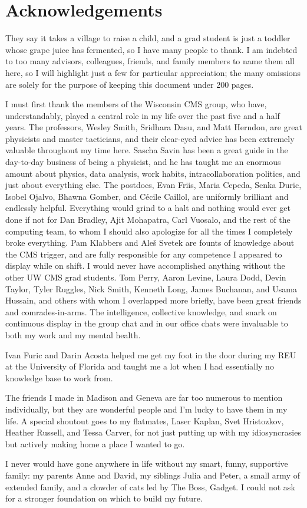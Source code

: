 
\section{Acknowledgements}

They say it takes a village to raise a child, and a grad student is just a toddler whose grape juice has fermented, so I have many people to thank.
I am indebted to too many advisors, colleagues, friends, and family members to name them all here, so I will highlight just a few for particular appreciation; the many omissions are solely for the purpose of keeping this document under 200 pages.

I must first thank the members of the Wisconsin CMS group, who have, understandably, played a central role in my life over the past five and a half years.
The professors, Wesley Smith, Sridhara Dasu, and Matt Herndon, are great physicists and master tacticians, and their clear-eyed advice has been extremely valuable throughout my time here.
Sascha Savin has been a great guide in the day-to-day business of being a physicist, and he has taught me an enormous amount about physics, data analysis, work habits, intracollaboration politics, and just about everything else.
The postdocs, Evan Friis, Maria Cepeda, Senka Duric, Isobel Ojalvo, Bhawna Gomber, and C{\'e}cile Caillol, are uniformly brilliant and endlessly helpful.
Everything would grind to a halt and nothing would ever get done if not for Dan Bradley, Ajit Mohapatra, Carl Vuosalo, and the rest of the computing team, to whom I should also apologize for all the times I completely broke everything.
Pam Klabbers and Ale{\v{s}} Svetek are founts of knowledge about the CMS trigger, and are fully responsible for any competence I appeared to display while on shift.
I would never have accomplished anything without the other UW CMS grad students.
Tom Perry, Aaron Levine, Laura Dodd, Devin Taylor, Tyler Ruggles, Nick Smith, Kenneth Long, James Buchanan, and Usama Hussain, and others with whom I overlapped more briefly, have been great friends and comrades-in-arms.
The intelligence, collective knowledge, and snark on continuous display in the group chat and in our office chats were invaluable to both my work and my mental health.

Ivan Furic and Darin Acosta helped me get my foot in the door during my REU at the University of Florida and taught me a lot when I had essentially no knowledge base to work from.

The friends I made in Madison and Geneva are far too numerous to mention individually, but they are wonderful people and I'm lucky to have them in my life.
A special shoutout goes to my flatmates, Laser Kaplan, Svet Hristozkov, Heather Russell, and Tessa Carver, for not just putting up with my idiosyncrasies but actively making home a place I wanted to go.

I never would have gone anywhere in life without my smart, funny, supportive family: my parents Anne and David, my siblings Julia and Peter, a small army of extended family, and a clowder of cats led by The Boss, Gadget.
I could not ask for a stronger foundation on which to build my future.
